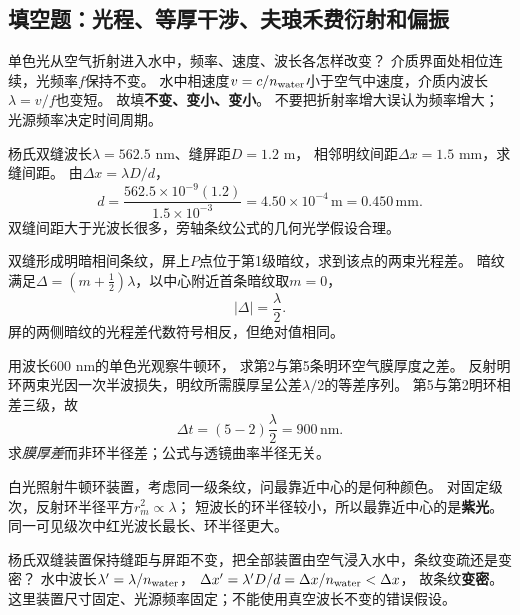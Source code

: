 
\subsection{填空题：光程、等厚干涉、夫琅禾费衍射和偏振}

\problemtext 单色光从空气折射进入水中，频率、速度、波长各怎样改变？
\workings
介质界面处相位连续，光频率$f$保持不变。
水中相速度$v=c/n_{\rm water}$小于空气中速度，介质内波长$\lambda=v/f$也变短。
故填\textbf{不变、变小、变小}。
\crosscheck 不要把折射率增大误认为频率增大；光源频率决定时间周期。

\problemtext 杨氏双缝波长$\lambda=562.5$ nm、缝屏距$D=1.2$ m，
相邻明纹间距$\Delta x=1.5$ mm，求缝间距。
\workings
由$\Delta x=\lambda D/d$，
\[
\boxed{d=\frac{562.5\times10^{-9}(1.2)}{1.5\times10^{-3}}
=4.50\times10^{-4}\,\mathrm m=0.450\,\mathrm{mm}}.
\]
\crosscheck 双缝间距大于光波长很多，旁轴条纹公式的几何光学假设合理。

\problemtext 双缝形成明暗相间条纹，屏上$P$点位于第1级暗纹，求到该点的两束光程差。
\workings
暗纹满足$\Delta=(m+\tfrac12)\lambda$，以中心附近首条暗纹取$m=0$，
\[
\boxed{|\Delta|=\frac{\lambda}{2}}.
\]
\crosscheck 屏的两侧暗纹的光程差代数符号相反，但绝对值相同。

\problemtext 用波长$600$ nm的单色光观察牛顿环，
求第2与第5条明环空气膜厚度之差。
\workings
反射明环两束光因一次半波损失，明纹所需膜厚呈公差$\lambda/2$的等差序列。
第5与第2明环相差三级，故
\[
\boxed{\Delta t=(5-2)\frac{\lambda}{2}=900\,\mathrm{nm}}.
\]
\crosscheck 求\emph{膜厚差}而非环半径差；公式与透镜曲率半径无关。

\problemtext 白光照射牛顿环装置，考虑同一级条纹，问最靠近中心的是何种颜色。
\workings
对固定级次，反射环半径平方$ r_m^2\propto\lambda$；
短波长的环半径较小，所以最靠近中心的是\textbf{紫光}。
\crosscheck 同一可见级次中红光波长最长、环半径更大。

\problemtext 杨氏双缝装置保持缝距与屏距不变，把全部装置由空气浸入水中，条纹变疏还是变密？
\workings
水中波长$\lambda'=\lambda/n_{\rm water}$，
$\Delta x'=\lambda'D/d=\Delta x/n_{\rm water}<\Delta x$，
故条纹\textbf{变密}。
\crosscheck 这里装置尺寸固定、光源频率固定；不能使用真空波长不变的错误假设。

